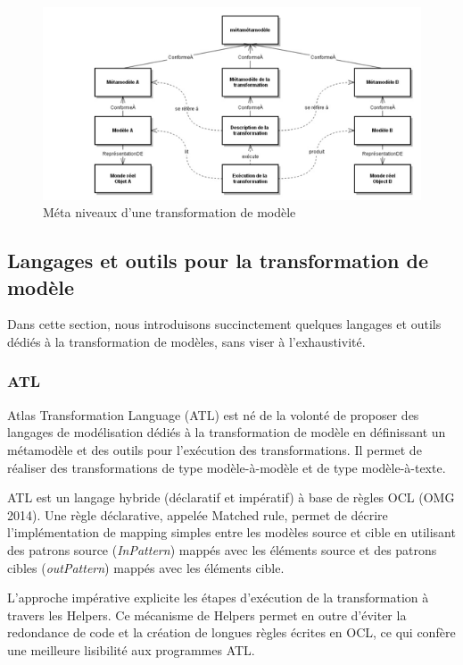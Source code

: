 \begin{figure}[!htbp]
 \begin{center}
  \includegraphics[width=1\textwidth]{images/Chapitre1/transfoPrincipe.png}
 \end{center}
 \caption{Méta niveaux d'une transformation de modèle}
 \label{fig:TransfoPrincipe}
\end{figure}

\subsection{Langages et outils pour la transformation de modèle}
Dans cette section, nous introduisons succinctement quelques langages et outils 
dédiés à la transformation de modèles, sans viser à l'exhaustivité.

\subsubsection{ATL}
\label{sec:ATL}
Atlas Transformation Language (ATL) \cite{jouault2006transforming} 
\cite{jouault2008atl} est né de la volonté de proposer des langages de 
modélisation dédiés à la transformation de modèle en définissant un métamodèle 
et des outils pour l'exécution des transformations. Il permet de réaliser des 
transformations de type modèle-à-modèle et de type modèle-à-texte.

ATL  est un langage hybride (déclaratif et impératif) à base de règles OCL (OMG 
2014). Une règle déclarative, appelée Matched rule, permet de décrire 
l'implémentation de mapping simples entre les modèles source et cible en 
utilisant des patrons source (\textit{InPattern}) mappés avec les éléments 
source et des patrons cibles (\textit{outPattern}) mappés avec les éléments 
cible. 

L'approche impérative explicite les étapes d'exécution de la transformation à 
travers les Helpers. Ce mécanisme de Helpers permet en outre d'éviter la 
redondance de code et la création de longues règles écrites en OCL, ce qui 
confère une meilleure lisibilité aux programmes ATL. 

